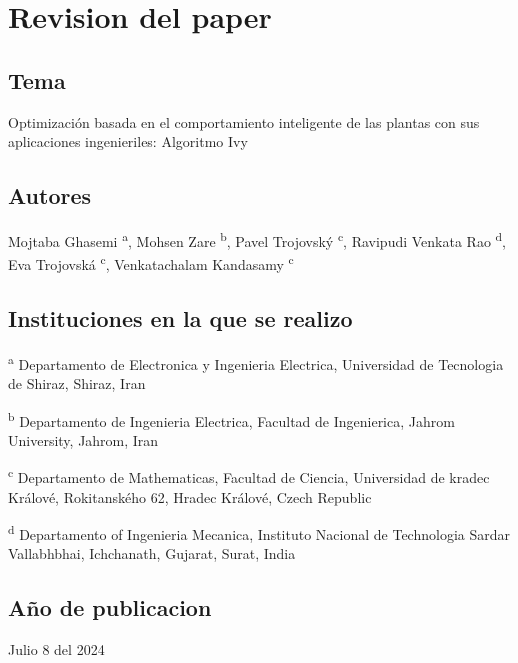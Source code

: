 \maketitle

\tableofcontents
\newpage

\section{Revision del paper}
\subsection{Tema}
Optimización basada en el comportamiento inteligente de las plantas con sus
aplicaciones ingenieriles: Algoritmo Ivy

\subsection{Autores}
Mojtaba Ghasemi \textsuperscript{a}, Mohsen Zare \textsuperscript{b}, Pavel
Trojovský \textsuperscript{c}, Ravipudi Venkata Rao \textsuperscript{d},
Eva Trojovská \textsuperscript{c}, Venkatachalam Kandasamy \textsuperscript{c}

\subsection{Instituciones en la que se realizo}
\noindent\textsuperscript{a} Departamento de Electronica y Ingenieria Electrica, Universidad de Tecnologia de Shiraz, Shiraz, Iran \par
\noindent\textsuperscript{b} Departamento de Ingenieria Electrica, Facultad de Ingenierica, Jahrom University, Jahrom, Iran \par
\noindent\textsuperscript{c} Departamento de Mathematicas, Facultad de Ciencia, Universidad de kradec Králové, Rokitanského 62, Hradec Králové, Czech Republic \par
\noindent\textsuperscript{d} Departamento of Ingenieria Mecanica, Instituto Nacional de Technologia Sardar Vallabhbhai, Ichchanath, Gujarat, Surat, India \par

\subsection{Año de publicacion}
Julio 8 del 2024

